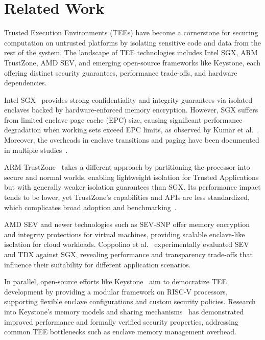 \section{Related Work}

Trusted Execution Environments (TEEs) have become a cornerstone for securing computation on untrusted platforms by isolating sensitive code and data from the rest of the system. The landscape of TEE technologies includes Intel SGX, ARM TrustZone, AMD SEV, and emerging open-source frameworks like Keystone, each offering distinct security guarantees, performance trade-offs, and hardware dependencies.

Intel SGX~\cite{akkram2020scientific, kumar2022sgxgauge} provides strong confidentiality and integrity guarantees via isolated enclaves backed by hardware-enforced memory encryption. However, SGX suffers from limited enclave page cache (EPC) size, causing significant performance degradation when working sets exceed EPC limits, as observed by Kumar et al.~\cite{kumar2022sgxgauge}. Moreover, the overheads in enclave transitions and paging have been documented in multiple studies~\cite{akkram2020scientific, krahn2020teemon}.

ARM TrustZone~\cite{suzaki2021tsperf} takes a different approach by partitioning the processor into secure and normal worlds, enabling lightweight isolation for Trusted Applications but with generally weaker isolation guarantees than SGX. Its performance impact tends to be lower, yet TrustZone’s capabilities and APIs are less standardized, which complicates broad adoption and benchmarking~\cite{turn0search9}.

AMD SEV and newer technologies such as SEV-SNP offer memory encryption and integrity protections for virtual machines, providing scalable enclave-like isolation for cloud workloads. Coppolino et al.~\cite{coppolino2025experimental} experimentally evaluated SEV and TDX against SGX, revealing performance and transparency trade-offs that influence their suitability for different application scenarios.

In parallel, open-source efforts like Keystone~\cite{Lee2019} aim to democratize TEE development by providing a modular framework on RISC-V processors, supporting flexible enclave configurations and custom security policies. Research into Keystone’s memory models and sharing mechanisms~\cite{yu2022elasticlave, lee2022cerberus} has demonstrated improved performance and formally verified security properties, addressing common TEE bottlenecks such as enclave memory management overhead.

